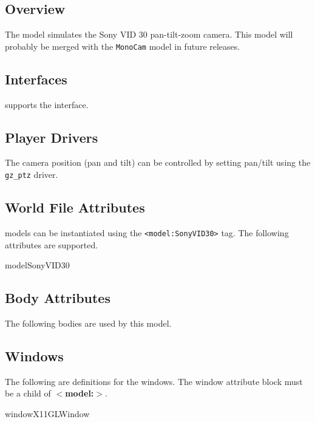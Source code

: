 

\subsection{Overview}

The {\tt \modelName} model simulates the Sony VID 30 pan-tilt-zoom
camera.  This model will probably be merged with the {\tt MonoCam}
model in future releases.


\subsection{\libgazebo Interfaces}

{\tt \modelName} supports the  interface.


\subsection{Player Drivers}

The camera position (pan and tilt) can be controlled by setting
pan/tilt using the {\tt gz\_ptz} driver.


\subsection{World File Attributes}

{\tt \modelName} models can be instantiated using the
\verb+<model:SonyVID30>+ tag.  The following attributes are
supported.

\begin{xmlattrtable}{model}{SonyVID30}
\modeldefaults
{}

\end{xmlattrtable}



\subsection{Body Attributes}

The following bodies are used by this model.

\begin{bodyattrtable}
\bodydefaults
{}
\end{bodyattrtable}


\subsection{Windows}

The following are definitions for the windows. The window attribute block must be a child of {\bf$<$model:\modelName$>$}. 

\begin{xmlattrtable}{window}{X11GLWindow}
\end{xmlattrtable}









